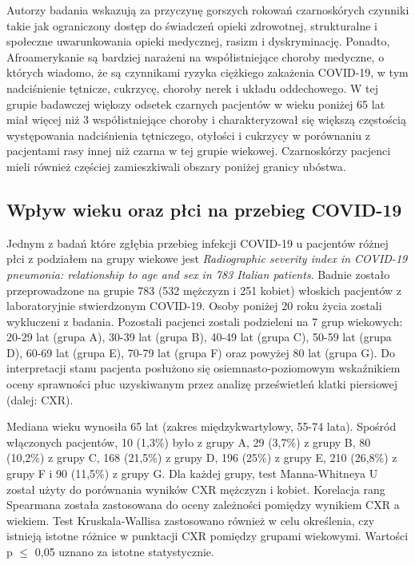 \documentclass[polish, twoside, 12pt, a4paper]{article}
\theoremstyle{definition}
\theoremstyle{plain}
\theoremstyle{remark}
\begin{document}
Autorzy badania wskazują za przyczynę gorszych rokowań czarnoskórych czynniki takie jak ograniczony dostęp do świadczeń opieki zdrowotnej, strukturalne i społeczne uwarunkowania opieki medycznej, rasizm i dyskryminację. Ponadto, Afroamerykanie są bardziej narażeni na współistniejące choroby medyczne, o których wiadomo, że są czynnikami ryzyka ciężkiego zakażenia COVID-19, w tym nadciśnienie tętnicze, cukrzycę, choroby nerek i układu oddechowego. W tej grupie badawczej większy odsetek czarnych pacjentów w wieku poniżej 65 lat miał więcej niż 3 współistniejące choroby i charakteryzował się większą częstością występowania nadciśnienia tętniczego, otyłości i cukrzycy w porównaniu z pacjentami rasy innej niż czarna w tej grupie wiekowej. Czarnoskórzy pacjenci mieli również częściej zamieszkiwali obszary poniżej granicy ubóstwa. \cite{borghesi2020}

\subsection{Wpływ wieku oraz płci na przebieg COVID-19}

Jednym z badań które zgłębia przebieg infekcji COVID-19 u pacjentów różnej płci z podziałem na grupy wiekowe jest \emph{Radiographic severity index in COVID-19 pneumonia: relationship to age and sex in 783 Italian patients}. Badnie zostało przeprowadzone na grupie 783 (532 mężczyzn i 251 kobiet) włoskich pacjentów z laboratoryjnie stwierdzonym COVID-19. Osoby poniżej 20 roku życia zostali wykluczeni z badania. Pozostali pacjenci zostali podzieleni na 7 grup wiekowych: 20-29 lat (grupa A), 30-39 lat (grupa B), 40-49 lat (grupa C), 50-59 lat (grupa D), 60-69 lat (grupa E), 70-79 lat (grupa F) oraz powyżej 80 lat (grupa G). Do interpretacji stanu pacjenta posłużono się osiemnasto-poziomowym wskaźnikiem oceny sprawności płuc uzyskiwanym przez analizę prześwietleń klatki piersiowej (dalej: CXR).

Mediana wieku wynosiła 65 lat (zakres międzykwartylowy, 55-74 lata). Spośród włączonych pacjentów, 10 (1,3\%) było z grupy A, 29 (3,7\%) z grupy B, 80 (10,2\%) z grupy C, 168 (21,5\%) z grupy D, 196 (25\%) z grupy E, 210 (26,8\%) z grupy F i 90 (11,5\%) z grupy G. Dla każdej grupy, test Manna-Whitneya U został użyty do porównania wyników CXR mężczyzn i kobiet. Korelacja rang Spearmana została zastosowana do oceny zależności pomiędzy wynikiem CXR a wiekiem. Test Kruskala-Wallisa zastosowano również w celu określenia, czy istnieją istotne różnice w punktacji CXR pomiędzy grupami wiekowymi. Wartości p $\leq$ 0,05 uznano za istotne statystycznie.
\end{document}
